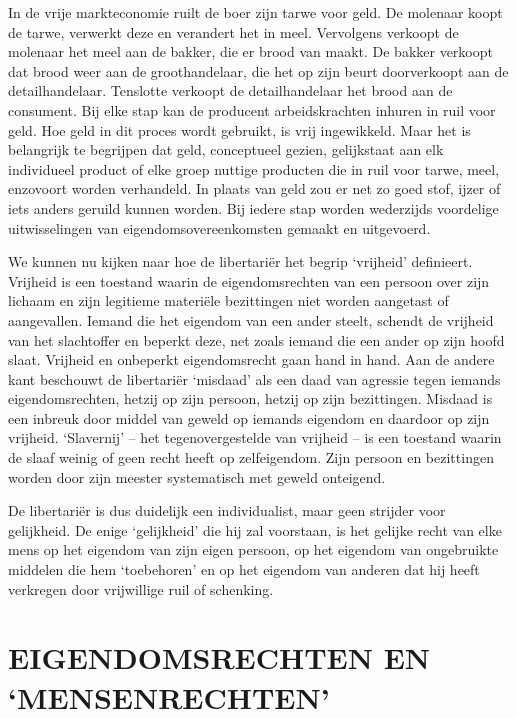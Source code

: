 \documentclass[
  a5paper,
  smalldemyvopaper,10pt,twoside,onecolumn,openright,extrafontsizes,hidelinks]{memoir}
\begin{document}
In de vrije markteconomie ruilt de boer zijn tarwe voor geld. De
molenaar koopt de tarwe, verwerkt deze en verandert het in meel.
Vervolgens verkoopt de molenaar het meel aan de bakker, die er brood van
maakt. De bakker verkoopt dat brood weer aan de groothandelaar, die het
op zijn beurt doorverkoopt aan de detailhandelaar. Tenslotte verkoopt de
detailhandelaar het brood aan de consument. Bij elke stap kan de
producent arbeidskrachten inhuren in ruil voor geld. Hoe geld in dit
proces wordt gebruikt, is vrij ingewikkeld. Maar het is belangrijk te
begrijpen dat geld, conceptueel gezien, gelijkstaat aan elk individueel
product of elke groep nuttige producten die in ruil voor tarwe, meel,
enzovoort worden verhandeld. In plaats van geld zou er net zo goed stof,
ijzer of iets anders geruild kunnen worden. Bij iedere stap worden
wederzijds voordelige uitwisselingen van eigendomsovereenkomsten gemaakt
en uitgevoerd.

We kunnen nu kijken naar hoe de libertariër het begrip `vrijheid'
definieert. Vrijheid is een toestand waarin de eigendomsrechten van een
persoon over zijn lichaam en zijn legitieme materiële bezittingen niet
worden aangetast of aangevallen. Iemand die het eigendom van een ander
steelt, schendt de vrijheid van het slachtoffer en beperkt deze, net
zoals iemand die een ander op zijn hoofd slaat. Vrijheid en onbeperkt
eigendomsrecht gaan hand in hand. Aan de andere kant beschouwt de
libertariër `misdaad' als een daad van agressie tegen iemands
eigendomsrechten, hetzij op zijn persoon, hetzij op zijn bezittingen.
Misdaad is een inbreuk door middel van geweld op iemands eigendom en
daardoor op zijn vrijheid. `Slavernij' -- het tegenovergestelde van
vrijheid -- is een toestand waarin de slaaf weinig of geen recht heeft
op zelfeigendom. Zijn persoon en bezittingen worden door zijn meester
systematisch met geweld onteigend.

De libertariër is dus duidelijk een individualist, maar geen strijder
voor gelijkheid. De enige `gelijkheid' die hij zal voorstaan, is het
gelijke recht van elke mens op het eigendom van zijn eigen persoon, op
het eigendom van ongebruikte middelen die hem `toebehoren' en op het
eigendom van anderen dat hij heeft verkregen door vrijwillige ruil of
schenking.

\section{EIGENDOMSRECHTEN EN
`MENSENRECHTEN'}\label{eigendomsrechten-en-mensenrechten}
\end{document}
